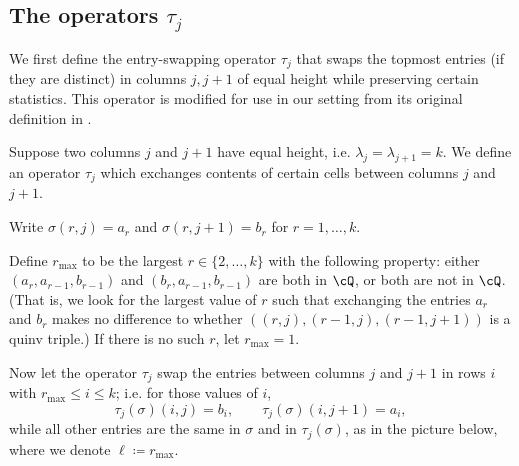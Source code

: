 \subsection{The operators $\tau_j$}

We first define the entry-swapping operator $\tau_j$ that swaps the topmost entries (if they are distinct) in columns $j,j+1$ of equal height while preserving certain statistics. This operator is modified for use in our setting from its original definition in \cite{LoehrNiese}.

\begin{defn}\label{def:tau}

Suppose two columns $j$ and $j+1$ have equal height, i.e.
$\lambda_j=\lambda_{j+1}=k$. We define an operator $\tau_j$ which
exchanges contents of certain cells between columns $j$ and $j+1$. 

Write $\sigma(r,j)=a_r$ and $\sigma(r,j+1)=b_r$ for $r=1,\dots, k$. 

Define $r_{\max}$ to be the largest $r\in\{2,\dots,k\}$ with the following property:
either $(a_r, a_{r-1}, b_{r-1})$ and $(b_r, a_{r-1}, b_{r-1})$ are both in $\cQ$,
or both are not in $\cQ$. \textup{(}That is, we look for the largest value of $r$ 
such that exchanging the entries $a_r$ and $b_r$
makes no difference to whether $((r,j), (r-1,j), (r-1, j+1))$ is a quinv triple.\textup{)}
If there is no such $r$, let $r_{\max}=1$. 

Now let the operator $\tau_j$ swap the entries between columns $j$ and $j+1$
in rows $i$ with $r_{\max}\leq i\leq k$; i.e. for those values of $i$,
\[
\tau_j(\sigma)(i,j)=b_i,
\qquad 
\tau_j(\sigma)(i,j+1)=a_i,
\]
while all other entries are the same in $\sigma$ and in $\tau_j(\sigma)$,
as in the picture below, where we denote $\ell\coloneqq r_{\max}$.



\end{defn}
